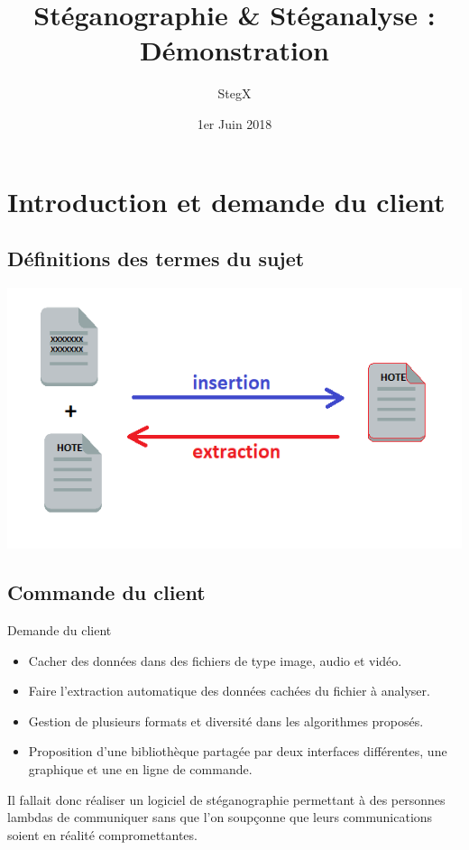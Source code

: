 \documentclass{beamer}
\title{Stéganographie \& Stéganalyse : Démonstration}
\author{StegX}
\institute{UFR des Sciences Versailles - L3 Informatique}
\date{1er Juin 2018}
\begin{document}
  \begin{frame}
  \titlepage
  \end{frame}
  
  \section{Introduction et demande du client}
  
  \subsection{Définitions des termes du sujet}
  
  \begin{frame}
  \hspace{5cm}
  \includegraphics[scale=0.7]{pictures/definition2.png}
  \end{frame}
  
  \subsection{Commande du client}
  
  \begin{frame}
   \begin{block}{Demande du client}
	\begin{itemize}
	[circle]
    \item Cacher des données dans des fichiers
        de type image, audio et vidéo. 
    \item Faire l'extraction automatique des données cachées du 
        fichier à analyser.
    \item Gestion de plusieurs formats et diversité dans les algorithmes proposés.
    \item Proposition d'une bibliothèque partagée par
        deux interfaces différentes, une graphique et une en ligne de commande.
	\end{itemize}
	\end{block}

	Il fallait donc réaliser un logiciel de stéganographie permettant à des
	personnes lambdas de communiquer sans que l'on soupçonne que leurs
	communications soient en réalité compromettantes. 

  \end{frame}
  
\end{document}
